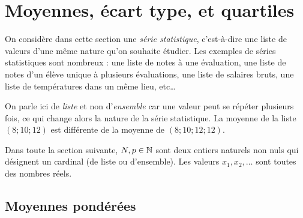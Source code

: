 




\section{Moyennes, écart type, et quartiles}

On considère dans cette section une \emph{série statistique}, c'est-à-dire une liste de valeurs d'une même nature qu'on souhaite étudier.
Les exemples de séries statistiques sont nombreux : une liste de notes à une évaluation, une liste de notes d'un élève unique à plusieurs évaluations, une liste de salaires bruts, une liste de températures dans un même lieu, etc…

On parle ici de \emph{liste} et non d'\emph{ensemble} car une valeur peut se répéter plusieurs fois, ce qui change alors la nature de la série statistique.
La moyenne de la liste $(8; 10; 12)$ est différente de la moyenne de $(8; 10; 12; 12)$.

Dans toute la section suivante, $N, p \in \mathbb{N}$ sont deux entiers naturels non nuls qui désignent un cardinal (de liste ou d'ensemble). 
Les valeurs $x_1, x_2, \dots$ sont toutes des nombres réels.


\subsection{Moyennes pondérées}

